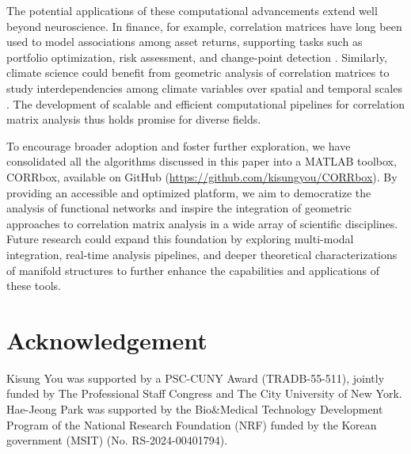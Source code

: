 \documentclass[10pt]{article}
\begin{document}
The potential applications of these computational advancements extend well beyond neuroscience. In finance, for example, correlation matrices have long been used to model associations among asset returns, supporting tasks such as portfolio optimization, risk assessment, and change-point detection \citep{mantegna_1999_HierarchicalStructureFinancial, bonanno_2003_TopologyCorrelationbasedMinimal, onnela_2003_DynamicsMarketCorrelations}. Similarly, climate science could benefit from geometric analysis of correlation matrices to study interdependencies among climate variables over spatial and temporal scales \citep{braunisch_2013_SelectingCorrelatedClimate, runge_2014_QuantifyingStrengthDelay}. The development of scalable and efficient computational pipelines for correlation matrix analysis thus holds promise for diverse fields.

To encourage broader adoption and foster further exploration, we have consolidated all the algorithms discussed in this paper into a MATLAB toolbox, \textsf{CORRbox}, available on GitHub (\url{https://github.com/kisungyou/CORRbox}). By providing an accessible and optimized platform, we aim to democratize the analysis of functional networks and inspire the integration of geometric approaches to correlation matrix analysis in a wide array of scientific disciplines. Future research could expand this foundation by exploring multi-modal integration, real-time analysis pipelines, and deeper theoretical characterizations of manifold structures to further enhance the capabilities and applications of these tools.

\section*{Acknowledgement}
Kisung You was supported by a PSC-CUNY Award (TRADB-55-511), jointly funded by The Professional Staff Congress and The City University of New York. Hae-Jeong Park was supported by the Bio\&Medical Technology Development Program of the National Research Foundation (NRF) funded by the Korean government (MSIT) (No. RS-2024-00401794).







\end{document}
